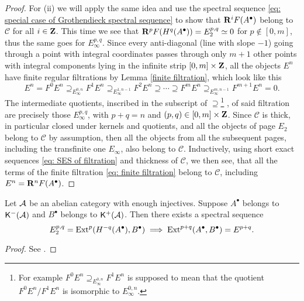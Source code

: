 \begin{proof}
    For (ii) we will apply the same idea and use the spectral sequence \eqref{eq: special case of Grothendieck spectral sequence} to show that $\mathbf{R}^{i}F(A^\bullet)$ belong to $\mathcal C$ for all $i \in \mathbf Z$. This time we see that $\mathbf{R}^{p}F(H^q(A^\bullet)) = E^{p,q}_2 \simeq 0$ for $p \notin [0,m]$, thus the same goes for $E^{p,q}_\infty$. Since every anti-diagonal (line with slope $-1$) going through a point with integral coordinates passes through only $m+1$ other points with integral components lying in the infinite strip $[0,m] \times \mathbf Z$, all the objects $E^n$ have finite regular filtrations by Lemma \ref{finite filtration}, which look like this
    \begin{equation}
        \label{eq: finite filtration}
        E^n = F^0E^n \supseteq_{E^{0,n}_\infty} F^1E^n \supseteq_{E^{1, n-1}_\infty} F^2E^n \supseteq \cdots \supseteq F^mE^n \supseteq_{E^{m, n-1}_\infty} F^{m+1}E^n = 0.
    \end{equation}
    The intermediate quotients, inscribed in the subscript of $\supseteq$\footnote{
        For example $F^0E^n \supseteq_{E^{0,n}_\infty} F^1E^n$ is supposed to mean that the quotient $F^0E^n / F^1E^n$ is isomorphic to $E^{0,n}_\infty$.}
    , of said filtration are precisely those $E^{p,q}_\infty$, with $p+q = n$ and $(p,q) \in [0,m] \times \mathbf Z$. Since $\mathcal C$ is thick, in particular closed under kernels and quotients, and all the objects of page $E_2$ belong to $\mathcal C$ by assumption, then all the objects from all the subsequent pages, including the transfinite one $E_\infty$, also belong to $\mathcal C$. 
    Inductively, using short exact sequences \eqref{eq: SES of filtration} and thickness of $\mathcal C$, we then see, that all the terms of the finite filtration \eqref{eq: finite filtration} belong to $\mathcal C$, including $E^n = \mathbf{R}^{n}F(A^\bullet)$.
\end{proof}

\begin{proposition}
    Let $\mathcal A$ be an abelian category with enough injectives. Suppose $A^\bullet$ belongs to $\mathsf{K}^-(\mathcal A)$ and $B^\bullet$ belongs to $\mathsf{K}^+(\mathcal A)$. Then there exists a spectral sequence 
    \[
        E^{p,q}_2 = \operatorname{Ext}^p(H^{-q}(A^\bullet), B^\bullet) \implies \operatorname{Ext}^{p+q}(A^\bullet, B^\bullet) = E^{p+q}.
    \]
\end{proposition}

\begin{proof}
    See \cite[\S 2, Example 2.70]{huybrechts2006fouriermukai}.
\end{proof}